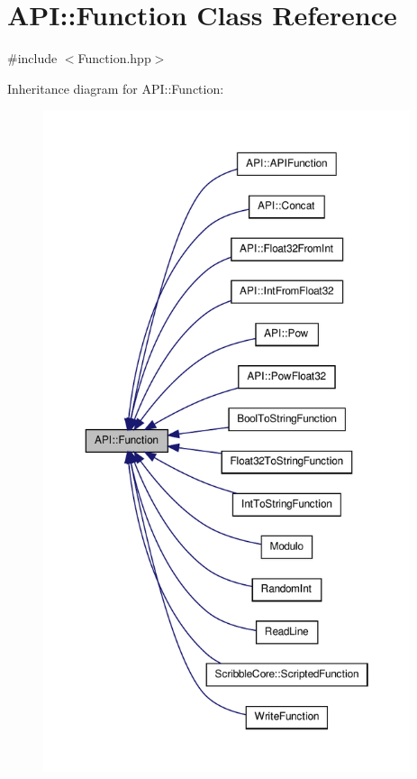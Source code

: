 \hypertarget{class_a_p_i_1_1_function}{\section{A\-P\-I\-:\-:Function Class Reference}
\label{class_a_p_i_1_1_function}
}


{\ttfamily \#include $<$Function.\-hpp$>$}



Inheritance diagram for A\-P\-I\-:\-:Function\-:
\nopagebreak
\begin{figure}[H]
\begin{center}
\leavevmode
\includegraphics[height=550pt]{class_a_p_i_1_1_function__inherit__graph}
\end{center}
\end{figure}
